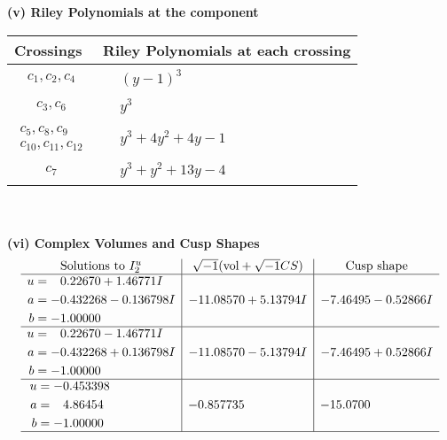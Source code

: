 \documentclass[1p]{elsarticle_modified}
\theoremstyle{definition}
\newcommand{\I}{\sqrt{-1}}
\begin{document}
\flushleft \textbf{(v) Riley Polynomials at the component}\newline \\
\begin{tabular}{m{50pt}|m{274pt}}
Crossings & \hspace{64pt}Riley Polynomials at each crossing \\
\hline $$\begin{aligned}c_{1},c_{2},c_{4}\end{aligned}$$&$\begin{aligned}
&(y-1)^3
\end{aligned}$\\
\hline $$\begin{aligned}c_{3},c_{6}\end{aligned}$$&$\begin{aligned}
&y^3
\end{aligned}$\\
\hline $$\begin{aligned}c_{5},c_{8},c_{9}\\c_{10},c_{11},c_{12}\end{aligned}$$&$\begin{aligned}
&y^3+4 y^2+4 y-1
\end{aligned}$\\
\hline $$\begin{aligned}c_{7}\end{aligned}$$&$\begin{aligned}
&y^3+y^2+13 y-4
\end{aligned}$\\
\hline
\end{tabular}\\~\\
\newpage\flushleft \textbf{(vi) Complex Volumes and Cusp Shapes}
$$\begin{array}{c|c|c}  
\text{Solutions to }I^u_{2}& \I (\text{vol} + \sqrt{-1}CS) & \text{Cusp shape}\\
 \hline 
\begin{aligned}
u &= \phantom{-}0.22670 + 1.46771 I \\
a &= -0.432268 - 0.136798 I \\
b &= -1.00000\phantom{ +0.000000I}\end{aligned}
 & -11.08570 + 5.13794 I & -7.46495 - 0.52866 I \\ \hline\begin{aligned}
u &= \phantom{-}0.22670 - 1.46771 I \\
a &= -0.432268 + 0.136798 I \\
b &= -1.00000\phantom{ +0.000000I}\end{aligned}
 & -11.08570 - 5.13794 I & -7.46495 + 0.52866 I \\ \hline\begin{aligned}
u &= -0.453398\phantom{ +0.000000I} \\
a &= \phantom{-}4.86454\phantom{ +0.000000I} \\
b &= -1.00000\phantom{ +0.000000I}\end{aligned}
 & -0.857735\phantom{ +0.000000I} & -15.0700\phantom{ +0.000000I}\\
 \hline 
 \end{array}$$\newpage\newpage\renewcommand{\arraystretch}{1}
\end{document}
